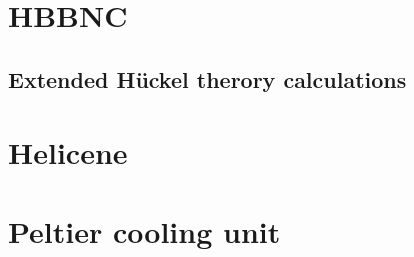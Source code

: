 \documentclass[
twoside,				%
BCOR=12mm,				%
headings=normal,		%
headsepline,			%
footsepline,			%
plainfootsepline,		%
]
{scrbook}
\begin{document}
\begin{appendices}
\chapter{HBBNC}
 
%
\section{\textbf{E}xtended \textbf{H}ückel \textbf{t}herory calculations}

\restoregeometry
 \chapter{Helicene}
  
\chapter{Peltier cooling unit}
 

\end{appendices}
\printbibliography
\end{document}
